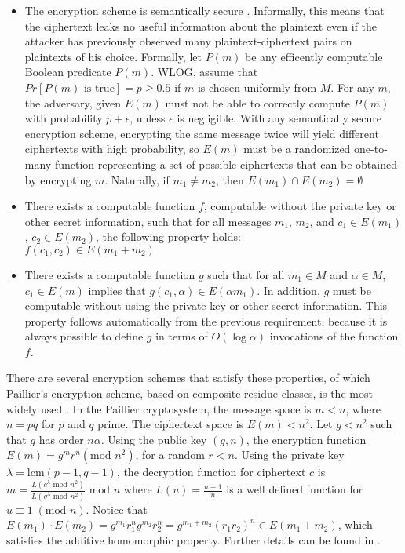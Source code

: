 \begin{itemize}
\item The encryption scheme is semantically secure \cite{Goldwasser:Micali}.
Informally, this means that the ciphertext leaks no useful information
about the plaintext even if the attacker has previously observed many
plaintext-ciphertext pairs on plaintexts of his choice. Formally,
let $P(m)$ be any efficently computable Boolean predicate $P(m)$.
WLOG, assume that $Pr[P(m)\mbox{ is true}]=p\ge0.5$ if $m$ is chosen
uniformly from $M$. For any $m$, the adversary, given $E(m)$ must
not be able to correctly compute $P(m)$ with probability $p+\epsilon$,
unless $\epsilon$ is negligible. With any semantically secure encryption
scheme, encrypting the same message twice will yield different ciphertexts
with high probability, so $E(m)$ must be a randomized one-to-many
function representing a set of possible ciphertexts that can be obtained
by encrypting $m$. Naturally, if $m_{1}\neq m_{2}$, then $E(m_{1})\cap E(m_{2})=\emptyset$
\item There exists a computable function $f$, computable without the private
key or other secret information, such that for all messages $m_{1}$,
$m_{2}$, and $c_{1}\in E(m_{1})$, $c_{2}\in E(m_{2})$, the following
property holds:\\
$f\left(c_{1},c_{2}\right)\in E(m_{1}+m_{2})$
\item There exists a computable function $g$ such that for all $m_{1}\in M$
and $\alpha\in M$, $c_{1}\in E(m)$ implies that $g(c_{1},\alpha)\in E(\alpha m_{1})$.
In addition, $g$ must be computable without using the private key
or other secret information. This property follows automatically from
the previous requirement, because it is always possible to define
$g$ in terms of $O(\log\alpha)$ invocations of the function $f$.
\end{itemize}
There are several encryption schemes that satisfy these properties,
of which Paillier's encryption scheme, based on composite residue
classes, is the most widely used \cite{Paillier99}. In the Paillier
cryptosystem, the message space is $m<n$, where $n=pq$ for $p$
and $q$ prime. The ciphertext space is $E(m)<n^{2}$. Let $g<n^{2}$
such that $g$ has order $n\alpha$. Using the public key $(g,n)$,
the encryption function $E(m)=g^{m}r^{n}\left(\mbox{mod }n^{2}\right)$,
for a random $r<n$. Using the private key $\lambda=\mbox{lcm}(p-1,q-1)$,
the decryption function for ciphertext $c$ is $m=\frac{L\left(c^{\lambda}\mbox{ mod }n^{2}\right)}{L\left(g^{\lambda}\mbox{ mod }n^{2}\right)}\mbox{ mod }n$
where $L(u)=\frac{u-1}{n}$ is a well defined function for $u\equiv1\;(\mbox{mod }n)$.
Notice that $E(m_{1})\cdot E(m_{2})=g^{m_{1}}r_{1}^{n}g^{m_{2}}r_{2}^{n}=g^{m_{1}+m_{2}}(r_{1}r_{2})^{n}\in E(m_{1}+m_{2})$,
which satisfies the additive homomorphic property. Further details
can be found in \cite{Paillier99}.


